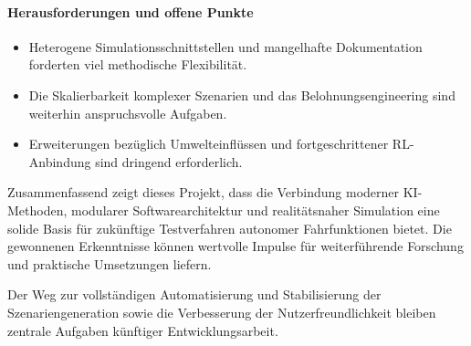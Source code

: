 \paragraph{Herausforderungen und offene Punkte}
\begin{itemize}
    \item Heterogene Simulationsschnittstellen und mangelhafte Dokumentation forderten viel methodische Flexibilität\cite{EinfuehrungIntegrationsprojekt}.
    \item Die Skalierbarkeit komplexer Szenarien und das Belohnungsengineering sind weiterhin anspruchsvolle Aufgaben.
    \item Erweiterungen bezüglich Umwelteinflüssen und fortgeschrittener RL-Anbindung sind dringend erforderlich\cite{EinfuehrungIntegrationsprojekt}.
\end{itemize}

Zusammenfassend zeigt dieses Projekt, dass die Verbindung moderner KI-Methoden, modularer Softwarearchitektur und realitätsnaher Simulation eine solide Basis für zukünftige Testverfahren autonomer Fahrfunktionen bietet. Die gewonnenen Erkenntnisse können wertvolle Impulse für weiterführende Forschung und praktische Umsetzungen liefern.

Der Weg zur vollständigen Automatisierung und Stabilisierung der Szenariengeneration sowie die Verbesserung der Nutzerfreundlichkeit bleiben zentrale Aufgaben künftiger Entwicklungsarbeit.
